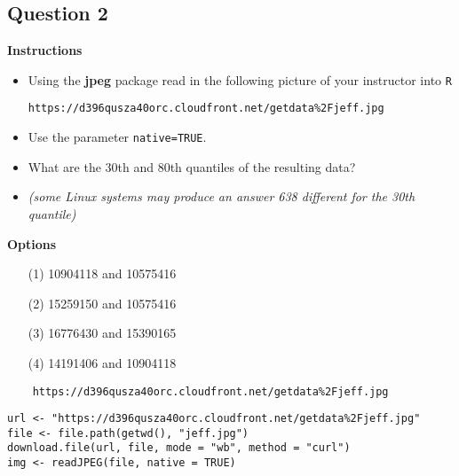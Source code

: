 \documentclass[]{article}
\begin{document}
\subsection*{Question 2}
\textbf{Instructions}
\begin{itemize}
\item Using the \textbf{jpeg} package read in the following picture of your instructor into \texttt{R} 

\begin{verbatim}
https://d396qusza40orc.cloudfront.net/getdata%2Fjeff.jpg 
\end{verbatim}

\item Use the parameter \texttt{native=TRUE}. 
\item What are the 30th and 80th quantiles of the resulting data? 

\item \textit{(some Linux systems may produce an answer 638 different for the 30th quantile)}
\end{itemize}

\bigskip
\textbf{Options}
\begin{itemize}
\item[(1)] 10904118 and 10575416
\item[(2)] 15259150 and 10575416
\item[(3)] 16776430 and 15390165
\item[(4)] 14191406  and 10904118
\end{itemize}


\begin{framed}
	\begin{verbatim}
	https://d396qusza40orc.cloudfront.net/getdata%2Fjeff.jpg
	\end{verbatim}
\end{framed}


\begin{framed}
\begin{verbatim}
url <- "https://d396qusza40orc.cloudfront.net/getdata%2Fjeff.jpg"
file <- file.path(getwd(), "jeff.jpg")
download.file(url, file, mode = "wb", method = "curl")
img <- readJPEG(file, native = TRUE)
\end{verbatim}
\end{framed}
\newpage
\end{document}
